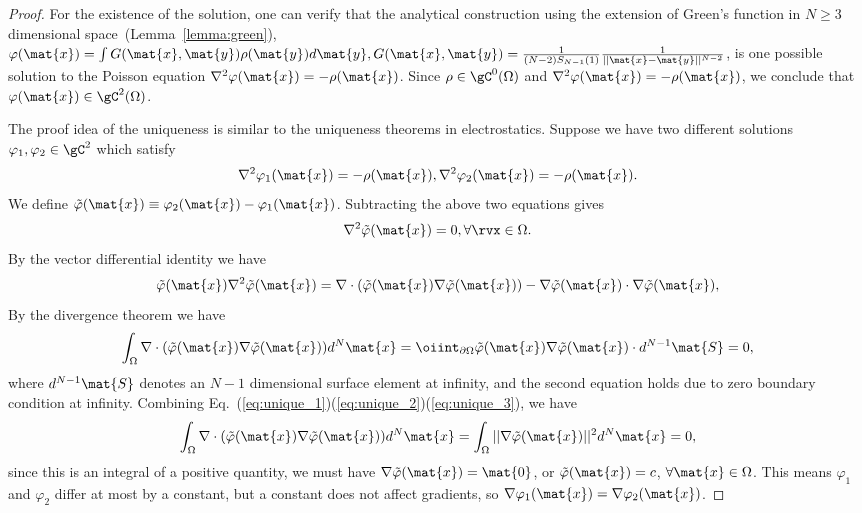 \begin{proof}

For the existence of the solution, one can verify that the analytical construction using the extension of Green's function in $N\ge 3$ dimensional space~(Lemma~\ref{lemma:green}), \ie $
    \varphi(\mat{x}) = \int G(\mat{x},\mat{y})\rho(\mat{y})d\mat{y},   G(\mat{x},\mat{y}) = \frac{1}{(N-2)S_{N-1}(1)} \frac{1}{||\mat{x}-\mat{y}||^{N-2}}
$, is one possible solution to the Poisson equation $\nabla^2\varphi(\mat{x})=-\rho(\mat{x})$. Since $\rho\in \gC^0(\Omega)$ and $\nabla^2\varphi(\mat{x})=-\rho(\mat{x})$, we conclude that $\varphi(\mat{x})\in \gC^2(\Omega)$.

The proof idea of the uniqueness is similar to the uniqueness theorems in electrostatics. Suppose we have two different solutions $\varphi_1,\varphi_2\in \gC^2$ which satisfy 
\begin{equation}
    \nabla^2\varphi_1(\mat{x}) = -\rho(\mat{x}), \nabla^2\varphi_2(\mat{x}) = -\rho(\mat{x}).
\end{equation}
We define $\tilde{\varphi}(\mat{x})\equiv\varphi_2(\mat{x})-\varphi_1(\mat{x})$. Subtracting the above two equations gives
\begin{equation}\label{eq:unique_1}
    \nabla^2\tilde{\varphi}(\mat{x}) = 0, \forall \rvx \in \Omega.
\end{equation}
By the  vector differential identity we have
\begin{equation}\label{eq:unique_2}
    \tilde{\varphi}(\mat{x})\nabla^2\tilde{\varphi}(\mat{x}) = \nabla\cdot(\tilde{\varphi}(\mat{x})\nabla\tilde{\varphi}(\mat{x}))-\nabla\tilde{\varphi}(\mat{x})\cdot \nabla\tilde{\varphi}(\mat{x}),
\end{equation}
By the divergence theorem we have
\begin{equation}\label{eq:unique_3}
    \int_{\Omega} \nabla\cdot(\tilde{\varphi}(\mat{x})\nabla\tilde{\varphi}(\mat{x})) d^N\mat{x} = \oiint_{\partial\Omega} \tilde{\varphi}(\mat{x})\nabla\tilde{\varphi}(\mat{x})\cdot d^{N-1}\mat{S} = 0,
\end{equation}
where $d^{N-1}\mat{S}$ denotes an $N-1$ dimensional surface element at infinity, and the second equation holds due to zero boundary condition at infinity. Combining Eq.~(\ref{eq:unique_1})(\ref{eq:unique_2})(\ref{eq:unique_3}), we have
\begin{equation}
    \int_{\Omega} \nabla\cdot(\tilde{\varphi}(\mat{x})\nabla\tilde{\varphi}(\mat{x})) d^N\mat{x}=\int_{\Omega} ||\nabla\tilde{\varphi}(\mat{x})||^2 d^N\mat{x}=0,
\end{equation}
since this is an integral of a positive quantity, we must have $\nabla\tilde{\varphi}(\mat{x})=\mat{0}$, or $\tilde{\varphi}(\mat{x})=c$, $\forall\mat{x}\in\Omega$. This means $\varphi_1$ and $\varphi_2$ differ at most by a constant, but a constant does not affect gradients, so $\nabla\varphi_1(\mat{x})=\nabla\varphi_2(\mat{x})$. \end{proof}


